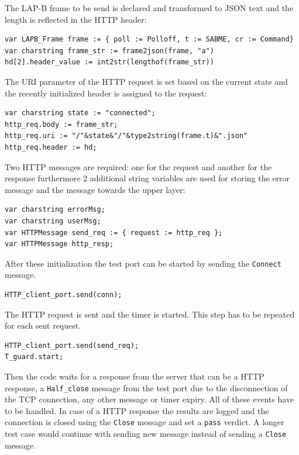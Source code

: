 \documentclass[a4paper]{article}
\begin{document}
The LAP-B frame to be send is declared and transformed to JSON text and the length is reflected in the HTTP header:

{\footnotesize
\begin{lstlisting}
var LAPB_Frame frame := { poll := Polloff, t := SABME, cr := Command}
var charstring frame_str := frame2json(frame, "a")
hd[2].header_value := int2str(lengthof(frame_str))
\end{lstlisting}
}

The URI parameter of the HTTP request is set based on the current state and the recently initialized header is assigned
to the request:

{\footnotesize
\begin{lstlisting}
var charstring state := "connected";
http_req.body := frame_str;
http_req.uri := "/"&state&"/"&type2string(frame.t)&".json"
http_req.header := hd;
\end{lstlisting}
}

Two HTTP messages are required: one for the request and another for the response furthermore 2 additional string
variables are used for storing the error message and the message towards the upper layer:

{\footnotesize
\begin{lstlisting}
var charstring errorMsg;
var charstring userMsg;
var HTTPMessage send_req := { request := http_req };
var HTTPMessage http_resp;
\end{lstlisting}
}

After these initialization the test port can be started by sending the \verb!Connect! message.

{\footnotesize
\begin{lstlisting}
HTTP_client_port.send(conn);
\end{lstlisting}
}

The HTTP request is sent and the timer is started. This step has to be repeated for each sent request.

{\footnotesize
\begin{lstlisting}
HTTP_client_port.send(send_req);
T_guard.start;
\end{lstlisting}
}

Then the code waits for a response from the server that can be a HTTP response, a \verb!Half_close! message
from the test port due to the disconnection of the TCP connection, any other message or timer expiry. All of these
events have to be handled. In case of a HTTP response the results are logged and the connection is closed using the
\verb!Close! message and set a \verb!pass! verdict. A longer test case would continue
with sending new message instead of sending a \verb!Close! message.
\end{document}
